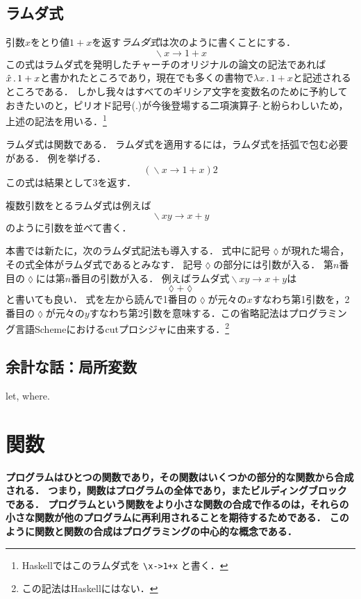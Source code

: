 \documentclass[twocolumn]{jsbook}
\DeclareMathOperator{\mathLambda}{\backslash}
\newcommand{\mathLambdaAnonymousParameter}{\lozenge}
\newcommand{\mathLambdaArrow}{\rightarrow}
\newcommand{\mathLambdaExpression}[2]{\mathLambda#1\mathLambdaArrow#2}
\newcommand{\keyword}[1]{\emph{#1}}
\newcommand{\code}[1]{\texttt{#1}}
\newenvironment{leader}{\begingroup\bf}{\endgroup}
\begin{document}
\section{ラムダ式}
引数$x$をとり値$1+x$を返す\keyword{ラムダ式}は次のように書くことにする．
$$\mathLambdaExpression{x}{1+x}$$
この式はラムダ式を発明したチャーチのオリジナルの論文の記法であれば$\Hat x\,.\,1+x$と書かれたところであり，現在でも多くの書物で$\lambda x\,.\,1+x$と記述されるところである．
しかし我々はすべてのギリシア文字を変数名のために予約しておきたいのと，ピリオド記号($.$)が今後登場する二項演算子$\cdot$と紛らわしいため，上述の記法を用いる．\footnote{Haskellではこのラムダ式を \code{\textbackslash x->1+x} と書く．}

ラムダ式は関数である．
ラムダ式を適用するには，ラムダ式を括弧で包む必要がある．
例を挙げる．
$$\left(\mathLambdaExpression{x}{1+x}\right)2$$
この式は結果として$3$を返す．

複数引数をとるラムダ式は例えば$$\mathLambdaExpression{xy}{x+y}$$のように引数を並べて書く．

本書では新たに，次のラムダ式記法も導入する．
式中に記号$\mathLambdaAnonymousParameter$が現れた場合，その式全体がラムダ式であるとみなす．
記号$\mathLambdaAnonymousParameter$の部分には引数が入る．
第$n$番目の$\mathLambdaAnonymousParameter$には第$n$番目の引数が入る．
例えばラムダ式$\mathLambdaExpression{xy}{x+y}$は$$\mathLambdaAnonymousParameter+\mathLambdaAnonymousParameter$$と書いても良い．
式を左から読んで1番目の$\mathLambdaAnonymousParameter$が元々の$x$すなわち第1引数を，2番目の$\mathLambdaAnonymousParameter$が元々の$y$すなわち第2引数を意味する．この省略記法はプログラミング言語Schemeにおけるcutプロシジャに由来する．\footnote{この記法はHaskellにはない．}

\section*{余計な話：局所変数}

let, where.

\chapter{関数}

\begin{leader}
プログラムはひとつの関数であり，その関数はいくつかの部分的な関数から合成される．
つまり，関数はプログラムの全体であり，またビルディングブロックである．
プログラムという関数をより小さな関数の合成で作るのは，それらの小さな関数が他のプログラムに再利用されることを期待するためである．
このように関数と関数の合成はプログラミングの中心的な概念である．
\end{leader}
\end{document}

